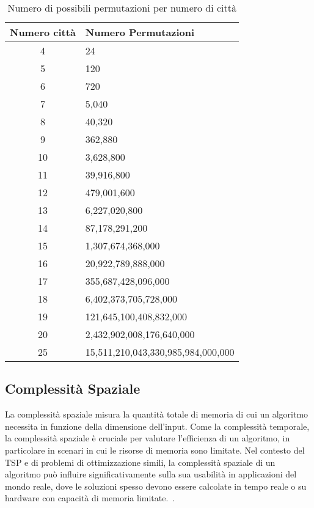 \begin{table}[h]
	\centering
	\caption{Numero di possibili permutazioni per numero di città}
	\begin{tabular}{c l}
		\toprule
		Numero città & Numero Permutazioni                \\
		\midrule
		4            & 24                                 \\
		5            & 120                                \\
		6            & 720                                \\
		7            & 5,040                              \\
		8            & 40,320                             \\
		9            & 362,880                            \\
		10           & 3,628,800                          \\
		11           & 39,916,800                         \\
		12           & 479,001,600                        \\
		13           & 6,227,020,800                      \\
		14           & 87,178,291,200                     \\
		15           & 1,307,674,368,000                  \\
		16           & 20,922,789,888,000                 \\
		17           & 355,687,428,096,000                \\
		18           & 6,402,373,705,728,000              \\
		19           & 121,645,100,408,832,000            \\
		20           & 2,432,902,008,176,640,000          \\
		25           & 15,511,210,043,330,985,984,000,000 \\
		\bottomrule
	\end{tabular}
\end{table}

\subsection{Complessità Spaziale}

La complessità spaziale misura la quantità totale di memoria di cui un algoritmo necessita in funzione della dimensione dell'input. Come la complessità temporale, la complessità spaziale è cruciale per valutare l'efficienza di un algoritmo, in particolare in scenari in cui le risorse di memoria sono limitate. Nel contesto del \gls{TSP} e di problemi di ottimizzazione simili, la complessità spaziale di un algoritmo può influire significativamente sulla sua usabilità in applicazioni del mondo reale, dove le soluzioni spesso devono essere calcolate in tempo reale o su hardware con capacità di memoria limitate.~\cite{HeldKarp1962}.

